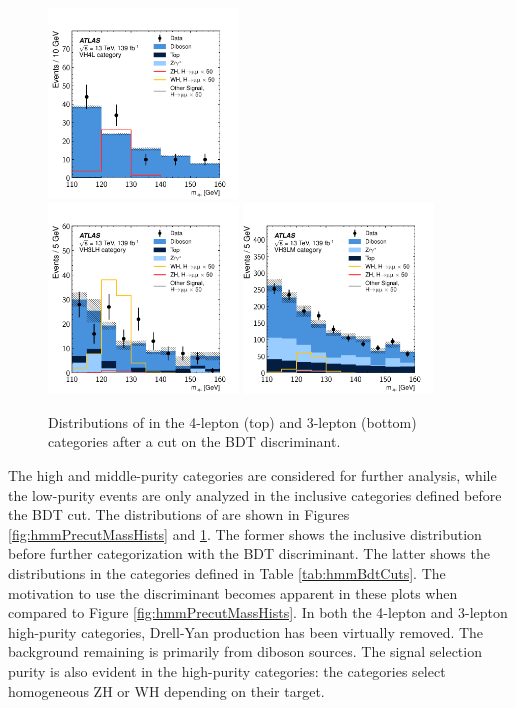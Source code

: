 \begin{figure}[htpb]
  \centering
  \includegraphics[width=0.45\textwidth]{figures/hmm/public/postCut/histo-4lep0-muu.pdf} \\
  \includegraphics[width=0.45\textwidth]{figures/hmm/public/postCut/histo-3lep0-muu.pdf} 
  \includegraphics[width=0.45\textwidth]{figures/hmm/public/postCut/histo-3lep1-muu.pdf} 
  \caption{Distributions of \muu in the 4-lepton (top) and 3-lepton (bottom) categories after a cut on the BDT discriminant.}
    \label{fig:hmmPostcutMassHists}
\end{figure}
\clearpage

The high and middle-purity categories are considered for further analysis, while the low-purity events are only analyzed in the inclusive categories defined before the BDT cut.
The distributions of \muu are shown in Figures \ref{fig:hmmPrecutMassHists} and \ref{fig:hmmPostcutMassHists}.
The former shows the inclusive distribution before further categorization with the BDT discriminant.
The latter shows the distributions in the categories defined in Table \ref{tab:hmmBdtCuts}.
The motivation to use the discriminant becomes apparent in these plots when compared to Figure \ref{fig:hmmPrecutMassHists}.
In both the 4-lepton and 3-lepton high-purity categories, Drell-Yan production has been virtually removed.
The background remaining is primarily from diboson sources.
The signal selection purity is also evident in the high-purity categories: the categories select homogeneous ZH or WH depending on their target.

